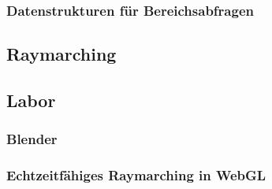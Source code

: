 \subsubsection{Datenstrukturen für Bereichsabfragen}

\subsection{Raymarching}
\subsection{Labor}
\subsubsection{Blender}
\subsubsection{Echtzeitfähiges Raymarching in WebGL}
